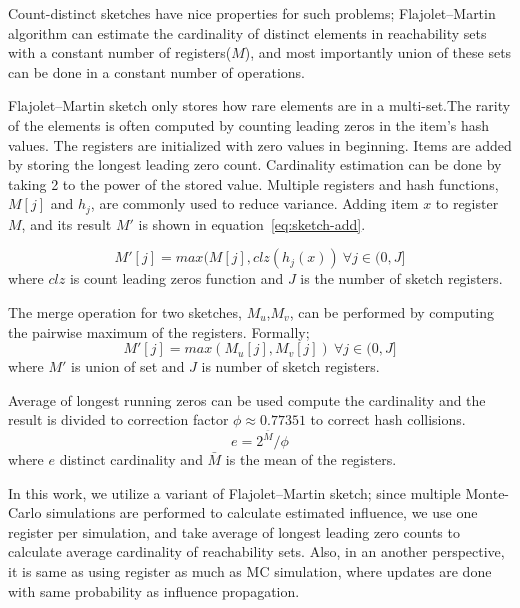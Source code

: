 \documentclass[10pt,journal,compsoc]{IEEEtran}
\begin{document}
Count-distinct sketches have nice properties for such problems; Flajolet–Martin algorithm\cite{flajolet1985probabilistic} can estimate the cardinality of distinct elements in reachability sets with a constant number of registers($M$), and most importantly union of these sets can be done in a constant number of operations.


Flajolet–Martin sketch only stores how rare elements are in a multi-set.The rarity of the elements is often computed by counting leading zeros in the item's hash values.  The registers are initialized with zero values in beginning. Items are added by storing the longest leading zero count. Cardinality estimation can be done by taking 2 to the power of the stored value. Multiple registers and hash functions, $M[j]$ and $h_j$, are commonly used to reduce variance.
Adding item $x$ to register $M$, and its result $M'$ is shown in equation~\ref{eq:sketch-add}.

\begin{equation}
    \label{eq:sketch-add}
    M'[j] = max(M[j],clz(h_j(x)) ~ \forall j\in(0,J]
\end{equation} where $clz$ is count leading zeros function and $J$ is the number of sketch registers.

The merge operation for two sketches, $M_u$,$M_v$, can be performed by computing the pairwise maximum of the registers. Formally; 
\begin{equation}
    \label{eq:sketch-merge}
    M'[j] = max(M_u[j],M_v[j]) ~ \forall j\in(0,J]
\end{equation} 
where $M'$ is union of set and $J$ is number of sketch registers.

Average of longest running zeros can be used compute the cardinality and the result is divided to correction factor $\phi \approx 0.77351$ to correct hash collisions.
\begin{equation}
    \label{eq:sketch-estimate}
    e = 2^{\bar{M}}/\phi
\end{equation} 
where $e$ distinct cardinality and $\bar{M}$ is the mean of the registers.

In this work, we utilize a variant of Flajolet–Martin sketch; since multiple Monte-Carlo simulations are performed to calculate estimated influence, we use one register per simulation, and take average of longest leading zero counts to calculate average cardinality of reachability sets. Also, in an another perspective, it is same as using register as much as MC simulation, where updates are done with same probability as influence propagation. 
\end{document}
